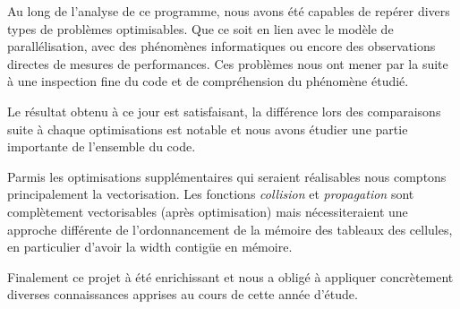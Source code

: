 Au long de l'analyse de ce programme, nous avons été capables de repérer divers types de problèmes optimisables. Que ce soit en lien avec le modèle de parallélisation, avec des phénomènes informatiques ou encore des observations directes de mesures de performances. Ces problèmes nous ont mener par la suite à une inspection fine du code et de compréhension du phénomène étudié.

Le résultat obtenu à ce jour est satisfaisant, la différence lors des comparaisons suite à chaque optimisations est notable et nous avons étudier une partie importante de l'ensemble du code.

Parmis les optimisations supplémentaires qui seraient réalisables nous comptons principalement la vectorisation. Les fonctions \textit{collision} et \textit{propagation} sont complètement vectorisables (après optimisation) mais nécessiteraient une approche différente de l'ordonnancement de la mémoire des tableaux des cellules, en particulier d'avoir la width contigüe en mémoire.

Finalement ce projet à été enrichissant et nous a obligé à appliquer concrètement diverses connaissances apprises au cours de cette année d'étude.